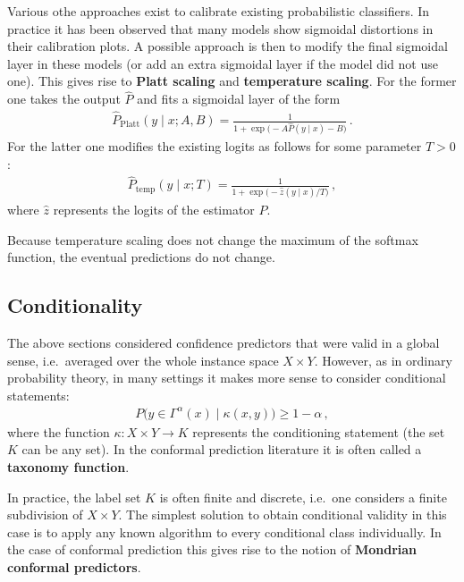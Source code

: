     Various othe approaches exist to calibrate existing probabilistic classifiers. In practice it has been observed that many models show sigmoidal distortions in their calibration plots. A possible approach is then to modify the final sigmoidal layer in these models (or add an extra sigmoidal layer if the model did not use one). This gives rise to \textbf{Platt scaling} and \textbf{temperature scaling}. For the former one takes the output $\widehat{P}$ and fits a sigmoidal layer of the form
    \begin{gather}
        \widehat{P}_{\text{Platt}}(y\mid x;A,B) = \frac{1}{1+\exp\bigl(-A\widehat{P}(y\mid x)-B\bigr)}\,.
    \end{gather}
    For the latter one modifies the existing logits as follows for some parameter $T>0$:
    \begin{gather}
        \widehat{P}_{\text{temp}}(y\mid x;T) = \frac{1}{1+\exp\bigl(-\widehat{z}(y\mid x)/T\bigr)}\,,
    \end{gather}
    where $\widehat{z}$ represents the logits of the estimator $\widehat{P}$.

    \begin{remark}[Accuracy]
        Because temperature scaling does not change the maximum of the softmax function, the eventual predictions do not change.
    \end{remark}

\subsection{Conditionality}

    The above sections considered confidence predictors that were valid in a global sense, i.e.~averaged over the whole instance space $X\times Y$. However, as in ordinary probability theory, in many settings it makes more sense to consider conditional statements:
    \begin{gather}
        \label{data:conditional_validity_condition}
        P\bigl(y\in\Gamma^\alpha(x)\mid\kappa(x,y)\bigr)\geq 1-\alpha\,,
    \end{gather}
    where the function $\kappa:X\times Y\rightarrow K$ represents the conditioning statement (the set $K$ can be any set). In the conformal prediction literature it is often called a \textbf{taxonomy function}.

    In practice, the label set $K$ is often finite and discrete, i.e.~one considers a finite subdivision of $X\times Y$. The simplest solution to obtain conditional validity in this case is to apply any known algorithm to every conditional class individually. In the case of conformal prediction this gives rise to the notion of \textbf{Mondrian conformal predictors}.

